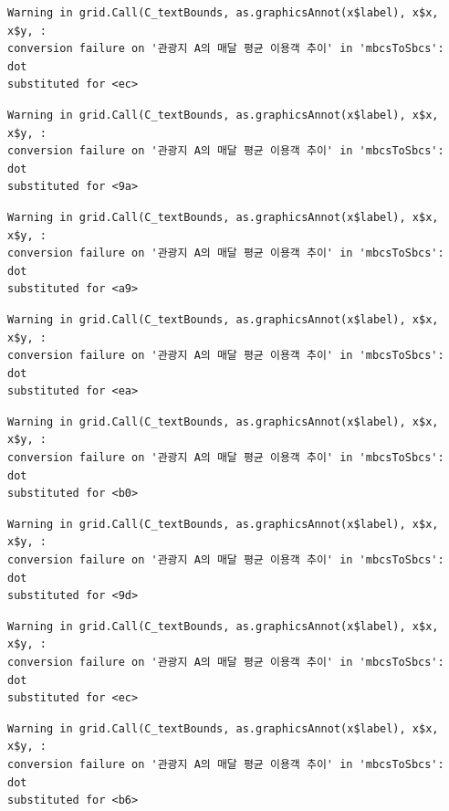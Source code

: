 \documentclass[
  letterpaper,
  DIV=11,
  numbers=noendperiod]{scrreprt}
\begin{document}
\begin{verbatim}
Warning in grid.Call(C_textBounds, as.graphicsAnnot(x$label), x$x, x$y, :
conversion failure on '관광지 A의 매달 평균 이용객 추이' in 'mbcsToSbcs': dot
substituted for <ec>
\end{verbatim}

\begin{verbatim}
Warning in grid.Call(C_textBounds, as.graphicsAnnot(x$label), x$x, x$y, :
conversion failure on '관광지 A의 매달 평균 이용객 추이' in 'mbcsToSbcs': dot
substituted for <9a>
\end{verbatim}

\begin{verbatim}
Warning in grid.Call(C_textBounds, as.graphicsAnnot(x$label), x$x, x$y, :
conversion failure on '관광지 A의 매달 평균 이용객 추이' in 'mbcsToSbcs': dot
substituted for <a9>
\end{verbatim}

\begin{verbatim}
Warning in grid.Call(C_textBounds, as.graphicsAnnot(x$label), x$x, x$y, :
conversion failure on '관광지 A의 매달 평균 이용객 추이' in 'mbcsToSbcs': dot
substituted for <ea>
\end{verbatim}

\begin{verbatim}
Warning in grid.Call(C_textBounds, as.graphicsAnnot(x$label), x$x, x$y, :
conversion failure on '관광지 A의 매달 평균 이용객 추이' in 'mbcsToSbcs': dot
substituted for <b0>
\end{verbatim}

\begin{verbatim}
Warning in grid.Call(C_textBounds, as.graphicsAnnot(x$label), x$x, x$y, :
conversion failure on '관광지 A의 매달 평균 이용객 추이' in 'mbcsToSbcs': dot
substituted for <9d>
\end{verbatim}

\begin{verbatim}
Warning in grid.Call(C_textBounds, as.graphicsAnnot(x$label), x$x, x$y, :
conversion failure on '관광지 A의 매달 평균 이용객 추이' in 'mbcsToSbcs': dot
substituted for <ec>
\end{verbatim}

\begin{verbatim}
Warning in grid.Call(C_textBounds, as.graphicsAnnot(x$label), x$x, x$y, :
conversion failure on '관광지 A의 매달 평균 이용객 추이' in 'mbcsToSbcs': dot
substituted for <b6>
\end{verbatim}
\end{document}
